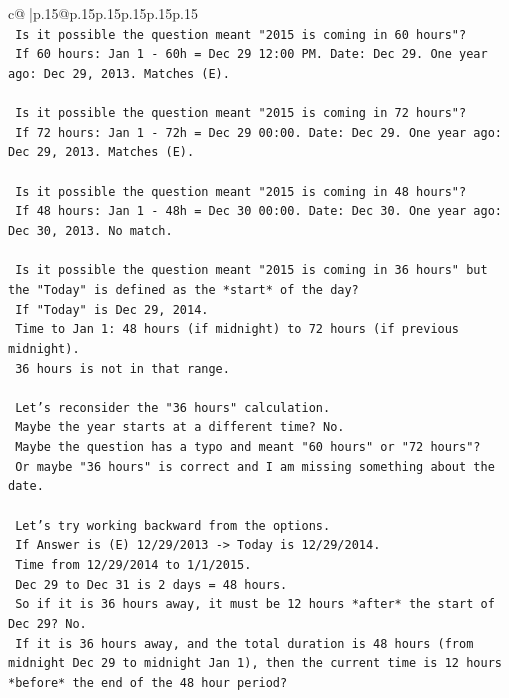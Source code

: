 \documentclass{article}
\begin{document}
{\begin{supertabular}{c@{$\;$}|p{.15\linewidth}@{}p{.15\linewidth}p{.15\linewidth}p{.15\linewidth}p{.15\linewidth}p{.15\linewidth}}
{{{\\ 
\texttt{    Is it possible the question meant "2015 is coming in 60 hours"?} \\
\texttt{    If 60 hours: Jan 1 {-} 60h = Dec 29 12:00 PM. Date: Dec 29. One year ago: Dec 29, 2013. Matches (E).} \\
\\ 
\texttt{    Is it possible the question meant "2015 is coming in 72 hours"?} \\
\texttt{    If 72 hours: Jan 1 {-} 72h = Dec 29 00:00. Date: Dec 29. One year ago: Dec 29, 2013. Matches (E).} \\
\\ 
\texttt{    Is it possible the question meant "2015 is coming in 48 hours"?} \\
\texttt{    If 48 hours: Jan 1 {-} 48h = Dec 30 00:00. Date: Dec 30. One year ago: Dec 30, 2013. No match.} \\
\\ 
\texttt{    Is it possible the question meant "2015 is coming in 36 hours" but the "Today" is defined as the *start* of the day?} \\
\texttt{    If "Today" is Dec 29, 2014.} \\
\texttt{    Time to Jan 1: 48 hours (if midnight) to 72 hours (if previous midnight).} \\
\texttt{    36 hours is not in that range.} \\
\\ 
\texttt{    Let's reconsider the "36 hours" calculation.} \\
\texttt{    Maybe the year starts at a different time? No.} \\
\texttt{    Maybe the question has a typo and meant "60 hours" or "72 hours"?} \\
\texttt{    Or maybe "36 hours" is correct and I am missing something about the date.} \\
\\ 
\texttt{    Let's try working backward from the options.} \\
\texttt{    If Answer is (E) 12/29/2013 {-}> Today is 12/29/2014.} \\
\texttt{    Time from 12/29/2014 to 1/1/2015.} \\
\texttt{    Dec 29 to Dec 31 is 2 days = 48 hours.} \\
\texttt{    So if it is 36 hours away, it must be 12 hours *after* the start of Dec 29? No.} \\
\texttt{    If it is 36 hours away, and the total duration is 48 hours (from midnight Dec 29 to midnight Jan 1), then the current time is 12 hours *before* the end of the 48 hour period?} \\
}}}
\end{supertabular}}
\end{document}
